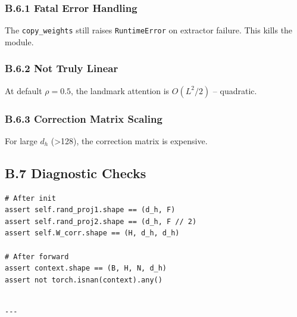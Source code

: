 \subsubsection{B.6.1 Fatal Error Handling}

The \texttt{copy\_weights} still raises \texttt{RuntimeError} on extractor failure. This 
kills the module.

\subsubsection{B.6.2 Not Truly Linear}

At default $\rho = 0.5$, the landmark attention is $O(L^2/2)$ -- 
quadratic.

\subsubsection{B.6.3 Correction Matrix Scaling}

For large $d_h$ (>128), the correction matrix is expensive.

\subsection{B.7 Diagnostic Checks}

\begin{lstlisting}
# After init
assert self.rand_proj1.shape == (d_h, F)
assert self.rand_proj2.shape == (d_h, F // 2)
assert self.W_corr.shape == (H, d_h, d_h)

# After forward
assert context.shape == (B, H, N, d_h)
assert not torch.isnan(context).any()
\end{lstlisting}
\begin{lstlisting}

---
\end{lstlisting}